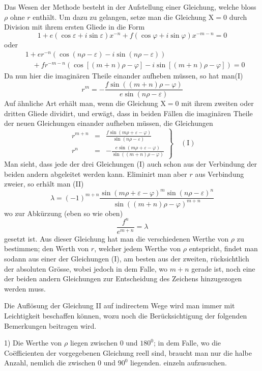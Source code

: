 Das Wesen der Methode besteht in der Aufstellung einer Gleichung, welche
bloss $\rho$ ohne $r$ enthält. Um dazu zu gelangen, setze man die Gleichung $\mathrm{X}=0$
durch Division mit ihrem ersten Gliede in die Form
\[
1+e(\cos\varepsilon+i\sin\varepsilon)x^{-n}+f(\cos\varphi+i\sin\varphi)x^{-m-n}=0
\]
oder
\[
\begin{aligned}&1+er^{-n}(\cos(n\rho-\varepsilon)-i\sin(n\rho-\varepsilon))\\
&\quad+fr^{-m-n}(\cos[(m+n)\rho-\varphi]-i\sin[(m+n)\rho-\varphi])=0\end{aligned}
\]
Da nun hier die imaginären Theile einander aufheben müssen, so hat man\nobreak\hspace{.5em}(I)
\[
r^m=-\frac{f\sin((m+n)\rho-\varphi)}{e\sin(n\rho-\varepsilon)}
\]
Auf ähnliche Art erhält man, wenn die Gleichung $\mathrm{X}=0$ mit ihrem zweiten
oder dritten Gliede dividirt, und erwägt, dass in beiden Fällen die imaginären
Theile der neuen Gleichungen einander aufheben müssen, die Gleichungen
\[
\left.
\begin{array}{rcl}
r^{m+n}&=&\displaystyle\frac{f\sin(m\rho+\varepsilon-\varphi)}{\sin(n\rho-\varepsilon)}\\[1.2ex]
r^n&=&\displaystyle-\frac{e\sin(m\rho+\varepsilon-\varphi)}{\sin((m+n)\rho-\varphi)}
\end{array}
\right\}\quad\mathrm{(I)}
\]
Man sieht, dass jede der drei Gleichungen (I) auch schon aus der Verbindung der
beiden andern abgeleitet werden kann. Eliminirt man aber $r$ aus Verbindung
zweier, so erhält man (II)
\[
\lambda=(-1)^{m+n}\frac{\sin(m\rho+\varepsilon-\varphi)^m\sin(n\rho-\varepsilon)^n}{\sin((m+n)\rho-\varphi)^{m+n}}
\]
wo zur Abkürzung (eben so wie oben)
\[
\frac{f^n}{e^{m+n}}=\lambda
\]
gesetzt ist. Aus dieser Gleichung hat man die verschiedenen Werthe von $\rho$ zu
bestimmen; den Werth von $r$, welcher jedem Werthe von $\rho$ entspricht, findet
man sodann aus einer der Gleichungen (I), am besten aus der zweiten, rücksichtlich der absoluten Grösse, wobei jedoch in dem Falle, wo $m+n$ gerade ist, noch
eine der beiden andern Gleichungen zur Entscheidung des Zeichens hinzugezogen
werden muss.

Die Auflösung der Gleichung II auf indirectem Wege wird man immer mit
Leichtigkeit beschaffen können, wozu noch die Berücksichtigung der folgenden
Bemerkungen beitragen wird.

1) Die Werthe von $\rho$ liegen zwischen $0$ und $180^{0}$; in dem Falle, wo die
Coëfficienten der vorgegebenen Gleichung reell sind, braucht man nur die halbe
Anzahl, nemlich die zwischen $0$ und $90^{0}$ liegenden. einzeln aufzusuchen.

